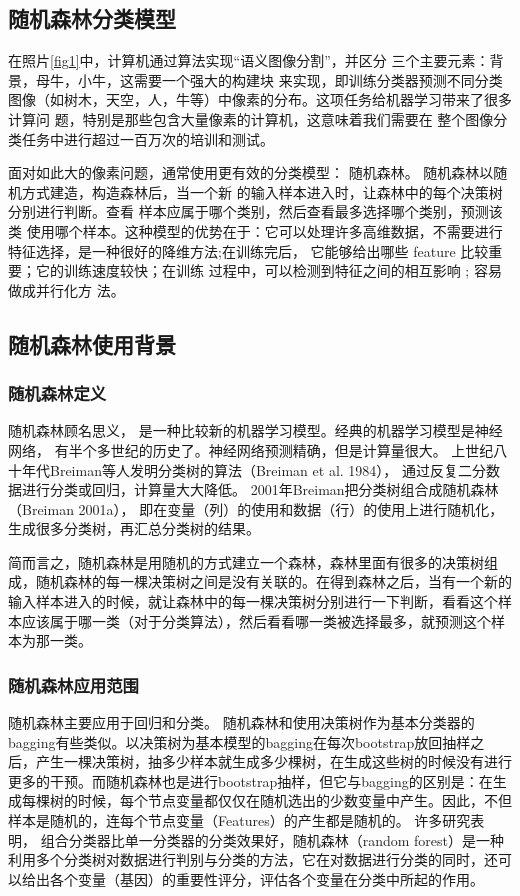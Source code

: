\documentclass[UTF8,a4paper,10pt,nocolorlinks]{ctexart}
\begin{document}
\begin{multicols}{2}
    \section{随机森林分类模型}
    在照片\ref{fig1}中，计算机通过算法实现“语义图像分割”，并区分
    三个主要元素：背景，母牛，小牛，这需要一个强大的构建块
    来实现，即训练分类器预测不同分类图像（如树木，天空，人，牛等）中像素的分布。这项任务给机器学习带来了很多计算问
    题，特别是那些包含大量像素的计算机，这意味着我们需要在
    整个图像分类任务中进行超过一百万次的培训和测试。\par
    面对如此大的像素问题，通常使用更有效的分类模型：
随机森林。 随机森林以随机方式建造，构造森林后，当一个新
的输入样本进入时，让森林中的每个决策树分别进行判断。查看
样本应属于哪个类别，然后查看最多选择哪个类别，预测该类
使用哪个样本。这种模型的优势在于：它可以处理许多高维数据，不需要进行特征选择，是一种很好的降维方法;在训练完后，
它能够给出哪些 feature 比较重要；它的训练速度较快；在训练
过程中，可以检测到特征之间的相互影响 ; 容易做成并行化方
法。\par
    \subsection{随机森林使用背景}
        \subsubsection{随机森林定义}
        随机森林顾名思义，
        是一种比较新的机器学习模型。经典的机器学习模型是神经网络，
        有半个多世纪的历史了。神经网络预测精确，但是计算量很大。
        上世纪八十年代Breiman等人发明分类树的算法（Breiman et al. 1984），
        通过反复二分数据进行分类或回归，计算量大大降低。
        2001年Breiman把分类树组合成随机森林（Breiman 2001a），
        即在变量（列）的使用和数据（行）的使用上进行随机化，生成很多分类树，再汇总分类树的结果。\par
        简而言之，随机森林是用随机的方式建立一个森林，森林里面有很多的决策树组成，随机森林的每一棵决策树之间是没有关联的。在得到森林之后，当有一个新的输入样本进入的时候，就让森林中的每一棵决策树分别进行一下判断，看看这个样本应该属于哪一类（对于分类算法），然后看看哪一类被选择最多，就预测这个样本为那一类。
        \subsubsection{随机森林应用范围}
        随机森林主要应用于回归和分类。
        随机森林和使用决策树作为基本分类器的bagging有些类似。以决策树为基本模型的bagging在每次bootstrap放回抽样之后，产生一棵决策树，抽多少样本就生成多少棵树，在生成这些树的时候没有进行更多的干预。而随机森林也是进行bootstrap抽样，但它与bagging的区别是：在生成每棵树的时候，每个节点变量都仅仅在随机选出的少数变量中产生。因此，不但样本是随机的，连每个节点变量（Features）的产生都是随机的。
        许多研究表明， 组合分类器比单一分类器的分类效果好，随机森林（random forest）是一种利用多个分类树对数据进行判别与分类的方法，它在对数据进行分类的同时，还可以给出各个变量（基因）的重要性评分，评估各个变量在分类中所起的作用。

\end{multicols}
\end{document}
